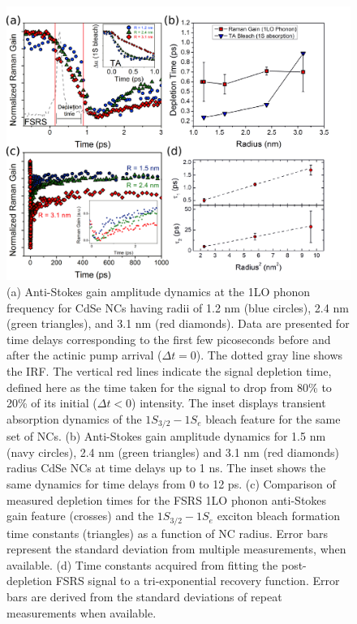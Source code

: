 \begin{figure}
\begin{center}
\includegraphics[width=\textwidth]{./Chapter2/fsrs3.pdf}
\caption[FSRS dynamics for a variety of CdSe NC sizes.]{(a) Anti-Stokes gain amplitude dynamics at the 1LO phonon frequency for CdSe NCs having radii of 1.2 nm (blue circles), 2.4 nm (green triangles), and 3.1 nm (red diamonds). Data are presented for time delays corresponding to the first few picoseconds
before and after the actinic pump arrival ($\Delta t = 0$).  The dotted gray line shows the IRF.  The vertical red lines indicate the signal depletion time, defined here as the time taken for the signal to drop from 80\% to 20\% of its initial ($\Delta t < 0$) intensity.  The inset displays transient absorption dynamics of the $1S_{3/2}-1S_e$ bleach feature for the same set of NCs.  (b) Anti-Stokes gain amplitude dynamics for 1.5 nm (navy circles), 2.4 nm (green triangles) and 3.1 nm (red diamonds) radius CdSe NCs at time delays up to 1 ns.  The inset shows the same dynamics for time delays from 0 to 12 ps.  (c) Comparison of measured depletion times for the FSRS 1LO phonon anti-Stokes gain feature (crosses) and the $1S_{3/2}-1S_e$ exciton bleach formation time constants (triangles) as a function of NC radius.  Error bars represent the standard deviation from multiple measurements, when available. (d) Time constants acquired from fitting the post-depletion FSRS signal to a tri-exponential recovery function. Error bars are derived from the standard deviations of repeat measurements when available.}
\label{f:fsrs3}
\end{center}
\end{figure}

